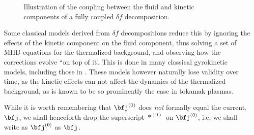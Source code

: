     \begin{figure}[!ht]
        \centering
        \caption{Illustration of the coupling between the fluid and kinetic components of a fully coupled $\delta\!f$ decomposition.}
        \label{fig:delta f coupling}
    \end{figure}
    
    Some classical models derived from $\delta\!f$ decompositions reduce this by ignoring the effects of the kinetic component on the fluid component, thus solving a set of MHD equations for the thermalized background, and observing how the corrections evolve ``on top of it'. This is done in many classical gyrokinetic models, including those in \cite{Parker_Lee_1993, Dimits_Lee_1993}. These models however naturally lose validity over time, as the kinetic effects can not affect the dynamics of the thermalized background, as is known to be so prominently the case in tokamak plasmas.
    
    While it is worth remembering that $\bfj^{(0)}$ does \emph{not} formally equal the current, $\bfj$, we shall henceforth drop the superscript $*^{(0)}$ on $\bfj^{(0)}$, i.e. we shall write as $\bfj^{(0)}$ as $\bfj$.
